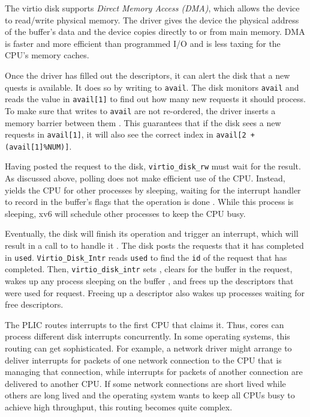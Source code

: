 The virtio disk supports \textit{Direct Memory Access
  (DMA)}, which allows the device to read/write physical
memory.  The driver gives the device the physical address of the
buffer's data  and the device
copies directly to or from main memory.  DMA is faster and more
efficient than programmed I/O and is less taxing for the CPU's memory
caches.

Once the driver has filled out the descriptors, it can alert the disk
that a new quests is available.  It does so by writing to
\lstinline{avail}.  The disk monitors \lstinline{avail} and reads the
value in \lstinline{avail[1]} to find out how many new requests it
should process.  To make sure that writes to \lstinline{avail} are not
re-ordered, the driver inserts a memory barrier between them
. This guarantees
that if the disk sees a new requests in \lstinline{avail[1]}, it will
also see the correct index in \lstinline{avail[2 + (avail[1]%NUM)]}.

Having posted the request to the disk,
\lstinline{virtio_disk_rw}
must wait for the result.  As discussed above,
polling does not make efficient use of the CPU.
Instead,
yields the CPU for other processes by sleeping,
waiting for the interrupt handler to 
record in the buffer's flags that the operation is done
.
While this process is sleeping,
xv6 will schedule other processes to keep the CPU busy.

Eventually, the disk will finish its operation and trigger an
interrupt, which will result in a call to
to handle it
.
The disk posts the requests that it has completed in \lstinline{used}.
\lstinline{Virtio_Disk_Intr}
reads \lstinline{used} to find the \lstinline{id} of
the request that has completed.
Then, \lstinline{virtio_disk_intr}
sets 
,
clears
 for the buffer in the request,
wakes up any process sleeping on the buffer
,
and frees up the descriptors that were used for request.
Freeing up a descriptor also wakes up processes
waiting for free descriptors.

The PLIC routes interrupts to the first CPU that claims it.
Thus, cores can process different disk interrupts concurrently.  In
some operating systems, this routing can get sophisticated.  For
example, a network driver might arrange to deliver interrupts for
packets of one network connection to the CPU that is managing
that connection, while interrupts for packets of another connection
are delivered to another CPU.  If some network connections are
short lived while others are long lived and the operating system wants
to keep all CPUs busy to achieve high throughput, this routing
becomes quite complex.

